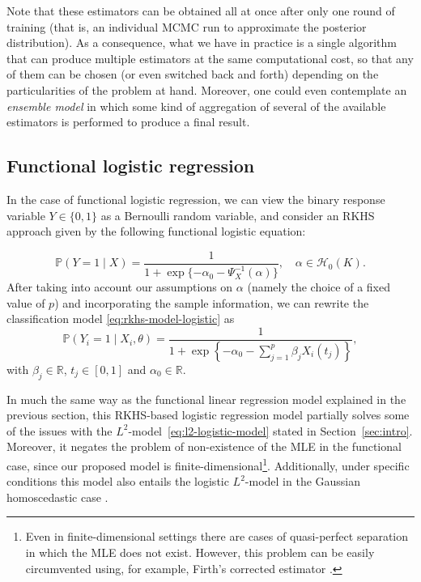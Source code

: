 \documentclass[ba]{imsart}
\numberwithin{equation}{section}
\theoremstyle{plain}
\newcommand{\R}{\mathbb{R}}
\begin{document}
Note that these estimators can be obtained all at once after only one round of training (that is, an individual MCMC run to approximate the posterior distribution). As a consequence, what we have in practice is a single algorithm that can produce multiple estimators at the same computational cost, so that any of them can be chosen (or even switched back and forth) depending on the particularities of the problem at hand. Moreover, one could even contemplate an \textit{ensemble model} in which some kind of aggregation of several of the available estimators is performed to produce a final result.

\subsection{Functional logistic regression}\label{sec:rkhs-logistic-model}

In the case of functional logistic regression, we can view the binary response variable \(Y\in\{0, 1\}\) as a Bernoulli random variable, and consider an RKHS approach given by the following functional logistic equation:

\begin{equation}\label{eq:rkhs-model-logistic}
  \mathbb P(Y=1 \mid X) = \frac{1}{1 + \exp\{-\alpha_0 - \Psi^{-1}_X(\alpha)\}}, \quad \alpha \in \mathcal H_0(K).
\end{equation}
After taking into account our assumptions on \(\alpha\) (namely the choice of a fixed value of \(p\)) and incorporating the sample information, we can rewrite the classification model \eqref{eq:rkhs-model-logistic} as
\begin{equation}\label{eq:rkhs-model-logistic-2}
  \mathbb P(Y_i=1 \mid X_i,\theta) = \frac{1}{\displaystyle 1 + \exp\left\{-\alpha_0 - \sum_{j=1}^p \beta_j X_i(t_j)\right\}},
\end{equation}
with \(\beta_j\in\R\), \(t_j\in[0, 1]\) and \(\alpha_0\in\R\).

In much the same way as the functional linear regression model explained in the previous section, this RKHS-based logistic regression model partially solves some of the issues with the \(L^2\)-model~\eqref{eq:l2-logistic-model} stated in Section~\ref{sec:intro}. Moreover, it negates the problem of non-existence of the MLE in the functional case, since our proposed model is finite-dimensional\footnote{Even in finite-dimensional settings there are cases of quasi-perfect separation in which the MLE does not exist. However, this problem can be easily circumvented using, for example, Firth's corrected estimator \citep{firth1993bias}.}. Additionally, under specific conditions this model also entails the logistic \(L^2\)-model in the Gaussian homoscedastic case \citep[see][Th. 1]{buenolarraz2021functional}.
\end{document}
